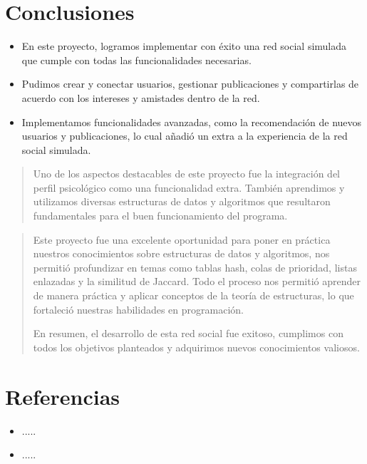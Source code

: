 \documentclass[9pt,letterpaper,onecolumn]{rho-class/rho}
\begin{document}
\section{Conclusiones}
\begin{itemize}
	\item En este proyecto, logramos implementar con éxito una red social simulada que cumple con todas las funcionalidades necesarias.
	\item Pudimos crear y conectar usuarios, gestionar publicaciones y compartirlas de acuerdo con los intereses y amistades dentro de la red.
	\item Implementamos funcionalidades avanzadas, como la recomendación de nuevos usuarios y publicaciones, lo cual añadió un extra a la experiencia de la red social simulada.
\end{itemize}

\begin{quote}
	Uno de los aspectos destacables de este proyecto fue la integración del perfil psicológico como una funcionalidad extra.
	También aprendimos y utilizamos diversas estructuras de datos y algoritmos que resultaron fundamentales para el buen funcionamiento del programa.
\end{quote}
\begin{quote}
	Este proyecto fue una excelente oportunidad para poner en práctica nuestros conocimientos sobre estructuras de datos y algoritmos, nos permitió profundizar en temas como tablas hash, colas de prioridad, listas enlazadas y la similitud de Jaccard. Todo el proceso nos permitió aprender de manera práctica y aplicar conceptos de la teoría de estructuras, lo que fortaleció nuestras habilidades en programación.
	
	En resumen, el desarrollo de esta red social fue exitoso, cumplimos con todos los objetivos planteados y adquirimos nuevos conocimientos valiosos.
\end{quote}
\newpage
\section{Referencias}
\begin{itemize}
	\item .....
	\item .....
\end{itemize}

\end{document}
